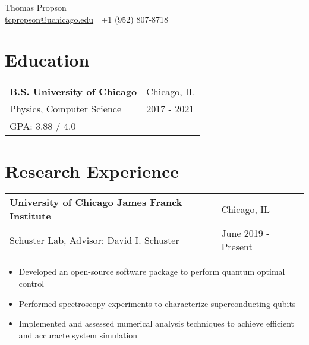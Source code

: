 \documentclass[letterpaper, 12pt]{article}
\begin{document}
\begin{center}
{\huge Thomas Propson} \\[5pt]
\href{mailto:tcpropson@uchicago.edu}{tcpropson@uchicago.edu} $\vert$
+1 (952) 807-8718 %
\end{center}

\flushleft
\section{Education}
\vspace{5pt}
\begin{tabular}{@{} L{12cm} @{} R{4.51cm} @{}}
  \textbf{B.S. University of Chicago} & Chicago, IL \\
  Physics, Computer Science & 2017 - 2021 \\
  GPA: 3.88 / 4.0 & \\
\end{tabular}
\vspace{5pt}


\section{Research Experience}
\vspace{5pt}
\begin{tabular}{@{} L{12cm} @{} R{4.51cm} @{}}
  \textbf{University of Chicago James Franck Institute} & Chicago, IL \\
  Schuster Lab, Advisor: David I. Schuster & June 2019 - Present \\
\end{tabular}
\vspace{-10pt}
\begin{itemize}
  \item Developed an open-source software package to perform quantum optimal control
  \item Performed spectroscopy experiments to characterize superconducting qubits
  \item Implemented and assessed numerical analysis techniques to achieve efficient and accuracte system simulation
\end{itemize}
\end{document}
